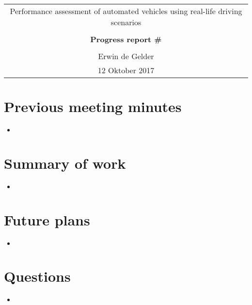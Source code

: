 \documentclass[10pt,final,a4paper,oneside,onecolumn]{article}
\newcommand{\progressreportnumber}{\#}
\renewcommand{\author}{Erwin de Gelder}
\renewcommand{\date}{12 Oktober 2017}
\renewcommand{\title}{Performance assessment of automated vehicles using real-life driving scenarios}
\begin{document}
	
\begin{center}
	\begin{tabular}{c}
		\title \\ \\
		\textbf{\huge Progress report \progressreportnumber} \\ \\
		\author \\ 
		\date
	\end{tabular}
\end{center}

\section*{Previous meeting minutes}

\begin{itemize}
	\item 
\end{itemize}

\section*{Summary of work}

\begin{itemize}
	\item 
\end{itemize}

\section*{Future plans}

\begin{itemize}
	\item 
\end{itemize}

\section*{Questions}

\begin{itemize}
	\item 
\end{itemize}



\end{document}
